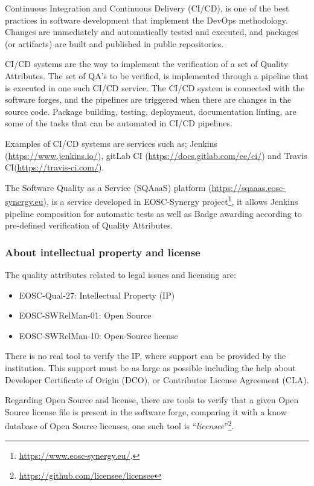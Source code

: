 Continuous Integration and Continuous Delivery (CI/CD), is one of the best practices in software development that implement the DevOps methodology. Changes are immediately and automatically tested and executed, and packages (or artifacts) are built and published in public repositories. 

CI/CD systems are the way to implement the verification of a set of Quality Attributes. The set of QA's to be verified, is implemented through a pipeline that is executed in one such CI/CD service. The CI/CD system is connected with the software forges, and the pipelines are triggered when there are changes in the source code.
Package building, testing, deployment, documentation linting, are some of the tasks that can be automated in CI/CD pipelines.

Examples of CI/CD systems are services such as; Jenkins (\url{https://www.jenkins.io/}), gitLab CI (\url{https://docs.gitlab.com/ee/ci/}) and Travis CI(\url{https://travis-ci.com/}).

The Software Quality as a Service (SQAaaS) platform (\url{https://sqaaas.eosc-synergy.eu}), is a service developed in EOSC-Synergy project\footnote{\url{https://www.eosc-synergy.eu/}.}, it allows Jenkins pipeline composition for automatic tests as well as Badge awarding according to pre-defined verification of Quality Attributes.

\subsubsection{About intellectual property and license}

The quality attributes related to legal issues and licensing are:

\begin{itemize}
  \item EOSC-Qual-27: Intellectual Property (IP)
  \item EOSC-SWRelMan-01: Open Source
  \item EOSC-SWRelMan-10: Open-Source license
\end{itemize}

There is no real tool to verify the IP, where support can be provided by the institution. This support must be as large as possible including the help about Developer Certificate of Origin (DCO), or Contributor License Agreement (CLA).

Regarding Open Source and license, there are tools to verify that a given Open Source license file is present in the software forge, comparing it with a know database of Open Source licenses, one such tool is ``\textit{licensee}''\footnote{\url{https://github.com/licensee/licensee}}.

